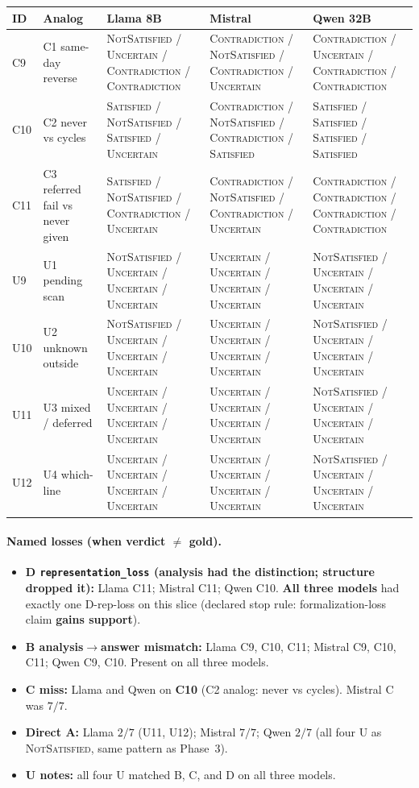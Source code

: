 \documentclass[11pt,a4paper]{article}
\newcommand{\sat}{\textsc{Satisfied}}
\newcommand{\nsat}{\textsc{NotSatisfied}}
\newcommand{\unc}{\textsc{Uncertain}}
\newcommand{\con}{\textsc{Contradiction}}
\begin{document}
{\small
\begin{center}
\begin{tabular}{ll lll}
\toprule
ID & Analog & Llama 8B & Mistral & Qwen 32B \\
\midrule
C9 & C1 same-day reverse
  & \nsat{} / \unc{} / \con{} / \con{}
  & \con{} / \nsat{} / \con{} / \unc{}
  & \con{} / \unc{} / \con{} / \con{} \\
C10 & C2 never vs cycles
  & \sat{} / \nsat{} / \sat{} / \unc{}
  & \con{} / \nsat{} / \con{} / \sat{}
  & \sat{} / \sat{} / \sat{} / \sat{} \\
C11 & C3 referred fail vs never given
  & \sat{} / \nsat{} / \con{} / \unc{}
  & \con{} / \nsat{} / \con{} / \unc{}
  & \con{} / \con{} / \con{} / \con{} \\
U9 & U1 pending scan
  & \nsat{} / \unc{} / \unc{} / \unc{}
  & \unc{} / \unc{} / \unc{} / \unc{}
  & \nsat{} / \unc{} / \unc{} / \unc{} \\
U10 & U2 unknown outside
  & \nsat{} / \unc{} / \unc{} / \unc{}
  & \unc{} / \unc{} / \unc{} / \unc{}
  & \nsat{} / \unc{} / \unc{} / \unc{} \\
U11 & U3 mixed / deferred
  & \unc{} / \unc{} / \unc{} / \unc{}
  & \unc{} / \unc{} / \unc{} / \unc{}
  & \nsat{} / \unc{} / \unc{} / \unc{} \\
U12 & U4 which-line
  & \unc{} / \unc{} / \unc{} / \unc{}
  & \unc{} / \unc{} / \unc{} / \unc{}
  & \nsat{} / \unc{} / \unc{} / \unc{} \\
\bottomrule
\end{tabular}
\end{center}
}

\paragraph{Named losses (when verdict $\neq$ gold).}
\begin{itemize}
  \item \textbf{D \texttt{representation\_loss} (analysis had the distinction; structure dropped it):}
        Llama C11; Mistral C11; Qwen C10.
        \textbf{All three models} had exactly one D-rep-loss on this slice (declared stop rule: formalization-loss claim \textbf{gains support}).
  \item \textbf{B analysis$\rightarrow$answer mismatch:}
        Llama C9, C10, C11; Mistral C9, C10, C11; Qwen C9, C10.
        Present on all three models.
  \item \textbf{C miss:} Llama and Qwen on \textbf{C10} (C2 analog: never vs cycles). Mistral C was $7/7$.
  \item \textbf{Direct A:} Llama $2/7$ (U11, U12); Mistral $7/7$; Qwen $2/7$ (all four U as \nsat{}, same pattern as Phase~3).
  \item \textbf{U notes:} all four U matched B, C, and D on all three models.
\end{itemize}
\end{document}

